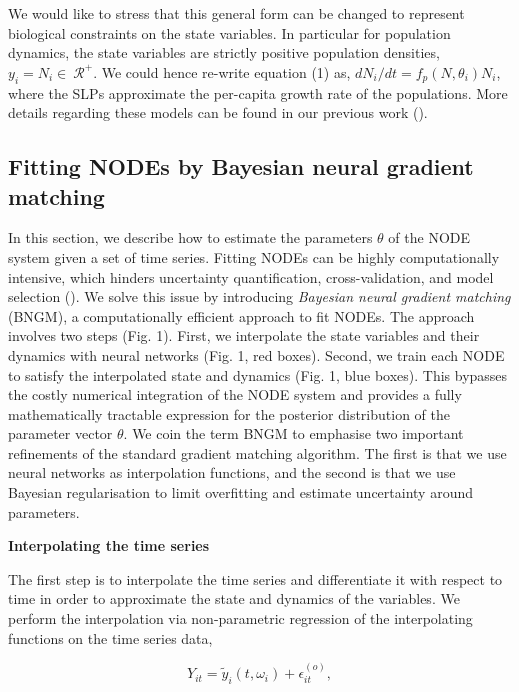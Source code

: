 \documentclass[11pt, oneside]{article}
\begin{document}
We would like to stress that this general form can be changed to represent biological constraints on the state variables.
In particular for population dynamics, the state variables are strictly positive population densities, $y_i = N_i \in~\mathcal{R^+}$.
We could hence re-write equation (1) as, $dN_i/dt = f_p(N,\theta_i)N_i$, where the SLPs approximate the per-capita growth rate of the populations.
More details regarding these models can be found in our previous work (\cite{Bonnaffe2021a}).

\subsection{Fitting NODEs by Bayesian neural gradient matching}

In this section, we describe how to estimate the parameters $\theta$ of the NODE system given a set of time series. 
Fitting NODEs can be highly computationally intensive, which hinders uncertainty quantification, cross-validation, and model selection (\cite{Bonnaffe2021a}).
We solve this issue by introducing \textit{Bayesian neural gradient matching} (BNGM), a computationally efficient approach to fit NODEs.
The approach involves two steps (Fig. 1).
First, we interpolate the state variables and their dynamics with neural networks (Fig. 1, red boxes).
Second, we train each NODE to satisfy the interpolated state and dynamics (Fig. 1, blue boxes).
This bypasses the costly numerical integration of the NODE system and provides a fully mathematically tractable expression for the posterior distribution of the parameter vector $\theta$. 
We coin the term BNGM to emphasise two important refinements of the standard gradient matching algorithm. 
The first is that we use neural networks as interpolation functions, and the second is that we use Bayesian regularisation to limit overfitting and estimate uncertainty around parameters.

\textbf{Interpolating the time series}

The first step is to interpolate the time series and differentiate it with respect to time in order to approximate the state and dynamics of the variables.
We perform the interpolation via non-parametric regression of the interpolating functions on the time series data,

\vspace{-0.5cm}
\begin{equation}
    Y_{it} = \tilde{y}_i(t,\omega_i) + \epsilon^{(o)}_{it},
\end{equation}
\end{document}
